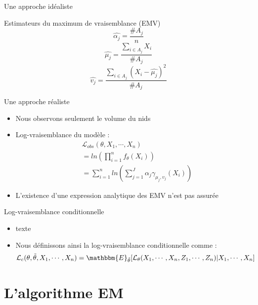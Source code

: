 \documentclass[11pt]{beamer}
\begin{document}
	\begin{frame}{Une approche idéaliste}
		\begin{block}{Estimateurs du maximum de vraisemblance (EMV)}
			\[
			\widehat{\alpha_j} = \frac{\#A_j}{n}
			\]
			\[
			\widehat{\mu_j} = \displaystyle\frac{\sum_{i\in A_j} X_i}{\#A_j}
			\]
			\[
			\widehat{v_j} = \displaystyle \frac{\sum_{i\in A_j}(X_i - \widehat{\mu_j})^2}{\#A_j}
			\]
		\end{block}
	\end{frame}


	\begin{frame}
		\begin{block}{Une approche réaliste}
			\begin{itemize}
				\item Nous observons seulement le volume du nids
				\item Log-vraisemblance du modèle :
				\begin{align*}
					& \mathcal{L}_{obs}(\theta, X_1, \cdots, X_n) \\
					&= ln\left( \displaystyle\prod_{i=1}^n f_\theta(X_i) \right)\\
					&= \displaystyle\sum_{i=1}^nln\left( \sum_{j=1}^J \alpha_j \gamma_{\mu_j, v_j}(X_i) \right)
				\end{align*}
				\item L'existence d'une expression analytique des EMV n'est pas assurée
			\end{itemize}
		\end{block}
	\end{frame}



	\begin{frame}{Log-vraisemblance conditionnelle}
		\begin{block}{}
			\scriptsize
			\begin{itemize}
				\item texte
				\item Nous définissons ainsi la log-vraisemblance conditionnelle comme :
					\[
					\mathcal{L}_{c}(\theta, \tilde{\theta}, X_1, \cdots, X_n) = \mathbbm{E}_{\tilde{\theta}}[\mathcal{L}_\theta(X_1, \cdots, X_n, Z_1, \cdots, Z_n) | X_1, \cdots, X_n]
					\]

			\end{itemize}
		\end{block}
	\end{frame}
	
	\section{L'algorithme EM}
\end{document}
